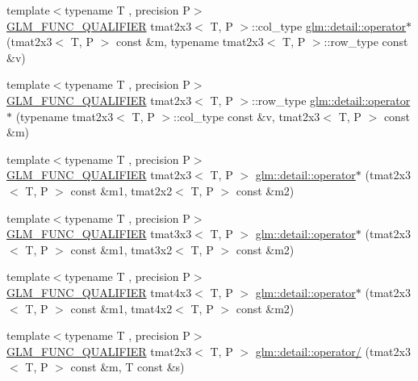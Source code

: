 \begin{DoxyCompactItemize}
\item 
{\footnotesize template$<$typename T , precision P$>$ }\\\hyperlink{setup_8hpp_a33fdea6f91c5f834105f7415e2a64407}{G\+L\+M\+\_\+\+F\+U\+N\+C\+\_\+\+Q\+U\+A\+L\+I\+F\+I\+ER} tmat2x3$<$ T, P $>$\+::col\+\_\+type \hyperlink{namespaceglm_1_1detail_a3fffd1b4a704d70dfa1e67898b327ed7}{glm\+::detail\+::operator$\ast$} (tmat2x3$<$ T, P $>$ const \&m, typename tmat2x3$<$ T, P $>$\+::row\+\_\+type const \&v)
\item 
{\footnotesize template$<$typename T , precision P$>$ }\\\hyperlink{setup_8hpp_a33fdea6f91c5f834105f7415e2a64407}{G\+L\+M\+\_\+\+F\+U\+N\+C\+\_\+\+Q\+U\+A\+L\+I\+F\+I\+ER} tmat2x3$<$ T, P $>$\+::row\+\_\+type \hyperlink{namespaceglm_1_1detail_a0c300dba24d3314c540f70467bf82f2b}{glm\+::detail\+::operator$\ast$} (typename tmat2x3$<$ T, P $>$\+::col\+\_\+type const \&v, tmat2x3$<$ T, P $>$ const \&m)
\item 
{\footnotesize template$<$typename T , precision P$>$ }\\\hyperlink{setup_8hpp_a33fdea6f91c5f834105f7415e2a64407}{G\+L\+M\+\_\+\+F\+U\+N\+C\+\_\+\+Q\+U\+A\+L\+I\+F\+I\+ER} tmat2x3$<$ T, P $>$ \hyperlink{namespaceglm_1_1detail_a680d7f92cfa2bbad584b0f54a1cc1630}{glm\+::detail\+::operator$\ast$} (tmat2x3$<$ T, P $>$ const \&m1, tmat2x2$<$ T, P $>$ const \&m2)
\item 
{\footnotesize template$<$typename T , precision P$>$ }\\\hyperlink{setup_8hpp_a33fdea6f91c5f834105f7415e2a64407}{G\+L\+M\+\_\+\+F\+U\+N\+C\+\_\+\+Q\+U\+A\+L\+I\+F\+I\+ER} tmat3x3$<$ T, P $>$ \hyperlink{namespaceglm_1_1detail_a8e50f16e87d3dd5fd1d23bc3d744d87b}{glm\+::detail\+::operator$\ast$} (tmat2x3$<$ T, P $>$ const \&m1, tmat3x2$<$ T, P $>$ const \&m2)
\item 
{\footnotesize template$<$typename T , precision P$>$ }\\\hyperlink{setup_8hpp_a33fdea6f91c5f834105f7415e2a64407}{G\+L\+M\+\_\+\+F\+U\+N\+C\+\_\+\+Q\+U\+A\+L\+I\+F\+I\+ER} tmat4x3$<$ T, P $>$ \hyperlink{namespaceglm_1_1detail_afb015dcb8ca6c43f345945505d390bce}{glm\+::detail\+::operator$\ast$} (tmat2x3$<$ T, P $>$ const \&m1, tmat4x2$<$ T, P $>$ const \&m2)
\item 
{\footnotesize template$<$typename T , precision P$>$ }\\\hyperlink{setup_8hpp_a33fdea6f91c5f834105f7415e2a64407}{G\+L\+M\+\_\+\+F\+U\+N\+C\+\_\+\+Q\+U\+A\+L\+I\+F\+I\+ER} tmat2x3$<$ T, P $>$ \hyperlink{namespaceglm_1_1detail_abf4262bb72f33ac6c7bf288ca395f06f}{glm\+::detail\+::operator/} (tmat2x3$<$ T, P $>$ const \&m, T const \&s)

\end{DoxyCompactItemize}
